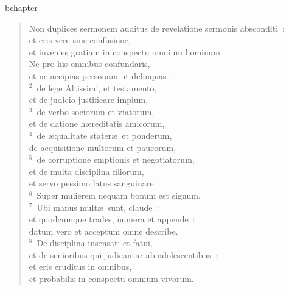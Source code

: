bchapter\begin{verse}\vspace{-19pt}Non duplices sermonem auditus de revelatione sermonis absconditi~:\\ et eris vere sine confusione,\\ et invenies gratiam in conspectu omnium hominum.\\ Ne pro his omnibus confundaris,\\ et ne accipias personam ut delinquas~:\\
${}^{2}$~de lege Altissimi, et testamento,\\ et de judicio justificare impium,\\
${}^{3}$~de verbo sociorum et viatorum,\\ et de datione h\ae reditatis amicorum,\\
${}^{4}$~de \ae qualitate stater\ae\ et ponderum,\\ de acquisitione multorum et paucorum,\\
${}^{5}$~de corruptione emptionis et negotiatorum,\\ et de multa disciplina filiorum,\\ et servo pessimo latus sanguinare.\\
${}^{6}$~Super mulierem nequam bonum est signum.\\
${}^{7}$~Ubi manus mult\ae\ sunt, claude~:\\ et quodcumque trades, numera et appende~:\\ datum vero et acceptum omne describe.\\
${}^{8}$~De disciplina insensati et fatui,\\ et de senioribus qui judicantur ab adolescentibus~:\\ et eris eruditus in omnibus,\\ et probabilis in conspectu omnium vivorum.\end{verse}


